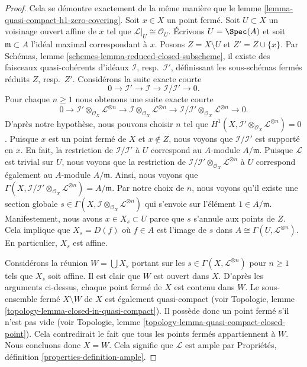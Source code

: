 \begin{proof}
Cela se démontre exactement de la même manière que le
lemme \ref{lemma-quasi-compact-h1-zero-covering}.
Soit $x \in X$ un point fermé. Soit $U \subset X$ un voisinage ouvert
affine de $x$ tel que $\mathcal{L}|_U \cong \mathcal{O}_U$.
Écrivons $U = \Spec(A)$ et soit
$\mathfrak m \subset A$ l'idéal maximal correspondant à $x$.
Posons $Z = X \setminus U$ et $Z' = Z \cup \{x\}$.
Par Schémas, lemme \ref{schemes-lemma-reduced-closed-subscheme},
il existe des faisceaux quasi-cohérents d'idéaux
$\mathcal{I}$, resp.\ $\mathcal{I}'$, définissant
les sous-schémas fermés réduits $Z$, resp.\ $Z'$.
Considérons la suite exacte courte
$$
0 \to \mathcal{I}' \to \mathcal{I} \to \mathcal{I}/\mathcal{I}' \to 0.
$$
Pour chaque $n \geq 1$ nous obtenons une suite exacte courte
$$
0 \to \mathcal{I}' \otimes_{\mathcal{O}_X} \mathcal{L}^{\otimes n}
\to \mathcal{I} \otimes_{\mathcal{O}_X} \mathcal{L}^{\otimes n} \to
\mathcal{I}/\mathcal{I}' \otimes_{\mathcal{O}_X} \mathcal{L}^{\otimes n} \to 0.
$$
D'après notre hypothèse, nous pouvons choisir $n$ tel que
$H^1(X, \mathcal{I}' \otimes_{\mathcal{O}_X} \mathcal{L}^{\otimes n}) = 0$.
Puisque $x$ est un point fermé de $X$ et $x \not \in Z$, nous voyons que
$\mathcal{I}/\mathcal{I}'$ est supporté en $x$. En fait, la restriction
de $\mathcal{I}/\mathcal{I'}$ à $U$ correspond au $A$-module
$A/\mathfrak m$. Puisque $\mathcal{L}$ est trivial sur $U$,
nous voyons que la restriction de
$\mathcal{I}/\mathcal{I}' \otimes_{\mathcal{O}_X} \mathcal{L}^{\otimes n}$
à $U$ correspond également au $A$-module $A/\mathfrak m$.
Ainsi, nous voyons que
$\Gamma(X, \mathcal{I}/\mathcal{I'} \otimes_{\mathcal{O}_X}
\mathcal{L}^{\otimes n}) = A/\mathfrak m$.
Par notre choix de $n$, nous voyons qu'il existe une section globale
$s \in \Gamma(X, \mathcal{I} \otimes_{\mathcal{O}_X} \mathcal{L}^{\otimes n})$
qui s'envoie sur l'élément $1 \in A/\mathfrak m$. Manifestement, nous avons
$x \in X_s \subset U$ parce que $s$ s'annule aux points de $Z$.
Cela implique que $X_s = D(f)$ où
$f \in A$ est l'image de $s$ dans $A \cong \Gamma(U, \mathcal{L}^{\otimes n})$.
En particulier, $X_s$ est affine.

\medskip\noindent
Considérons la réunion $W = \bigcup X_s$ portant sur les
$s \in \Gamma(X, \mathcal{L}^{\otimes n})$ pour $n \geq 1$
tels que $X_s$ soit affine. Il est clair que $W$ est ouvert dans $X$.
D'après les arguments ci-dessus, chaque point fermé de
$X$ est contenu dans $W$. Le sous-ensemble fermé $X \setminus W$ de $X$
est également quasi-compact
(voir Topologie, lemme \ref{topology-lemma-closed-in-quasi-compact}).
Il possède donc un point fermé s'il n'est pas vide (voir
Topologie, lemme \ref{topology-lemma-quasi-compact-closed-point}).
Cela contredirait le fait que tous les points fermés appartiennent à
$W$. Nous concluons donc $X = W$. Cela signifie que $\mathcal{L}$
est ample par Propriétés, définition \ref{properties-definition-ample}.
\end{proof}

